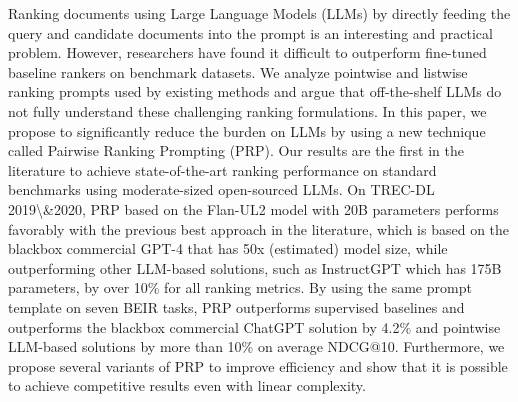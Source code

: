 Ranking documents using Large Language Models (LLMs) by directly feeding the query and candidate documents into the prompt is an interesting and practical problem. However,  researchers have found it difficult to outperform fine-tuned baseline rankers on benchmark datasets. We analyze pointwise and listwise ranking prompts used by existing methods and argue that off-the-shelf LLMs do not fully understand these challenging ranking formulations. In this paper, we propose to significantly reduce the burden on LLMs by using a new technique called Pairwise Ranking Prompting (PRP). Our results are the first in the literature to achieve state-of-the-art ranking performance on standard benchmarks using moderate-sized open-sourced LLMs. On TREC-DL 2019\textbackslash{}\&2020, PRP based on the Flan-UL2 model with 20B parameters performs favorably with the previous best approach in the literature, which is based on the blackbox commercial GPT-4 that has 50x (estimated) model size, while outperforming other LLM-based solutions, such as InstructGPT which has 175B parameters, by over 10\% for all ranking metrics. By using the same prompt template on seven BEIR tasks, PRP outperforms supervised baselines and outperforms the blackbox commercial ChatGPT solution by 4.2\% and pointwise LLM-based solutions by more than 10\% on average NDCG@10. Furthermore, we propose several variants of PRP to improve efficiency and show that it is possible to achieve competitive results even with linear complexity.